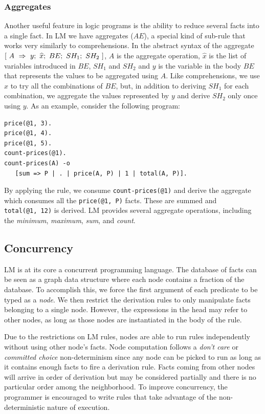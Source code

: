 \subsubsection{Aggregates}

Another useful feature in logic programs is the ability to reduce several facts into a single fact.
In LM we have aggregates ($AE$), a special kind of sub-rule that works very similarly to comprehensions.
In the abstract syntax of the aggregate $[~A~\Rightarrow~y;~\widehat{x};~BE;~SH_1;~SH_2~]$, $A$ is the aggregate operation, $\widehat{x}$ is the list of variables
introduced in $BE$, $SH_1$ and $SH_2$ and $y$ is the variable in the body
$BE$ that represents the values to be aggregated using $A$. Like comprehensions,
we use $\widehat{x}$ to try all the combinations of $BE$, but, in addition to deriving $SH_1$ for each combination,
we aggregate the values represented by $y$ and derive $SH_2$ only once using $y$.
As an example, consider the following program:

{\footnotesize
\begin{Verbatim}
price(@1, 3).
price(@1, 4).
price(@1, 5).
count-prices(@1).
count-prices(A) -o
   [sum => P | . | price(A, P) | 1 | total(A, P)].
\end{Verbatim}
}

By applying the rule, we consume \texttt{count-prices(@1)} and
derive the aggregate which consumes all the \texttt{price(@1, P)} facts.
These are summed and \texttt{total(@1,~12)} is derived.  
LM provides several aggregate operations, including the \emph{minimum}, \emph{maximum}, \emph{sum}, and \emph{count}.

\subsection{Concurrency}

LM is at its core a concurrent programming language.
The database of facts can be seen as a graph data structure where each node contains a fraction of the database.
To accomplish this, we force the first argument of each predicate to be typed as a \emph{node}. We then
restrict the derivation rules to only manipulate facts belonging to a single node.
However, the expressions in the head may refer to other nodes, as long as those nodes are instantiated in the body of the rule.

Due to the restrictions on LM rules, nodes are able to
run rules independently without using other node's facts. Node computation follows a
\emph{don't care} or \emph{committed choice} non-determinism
since any node can be picked to run as long as it contains enough facts to fire a derivation rule.
Facts coming from other nodes will arrive in order of derivation but may be considered
partially and there is no particular order among the neighborhood. To improve concurrency,
the programmer is encouraged to write rules that take advantage of the non-deterministic nature of execution.
